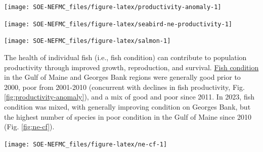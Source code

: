 \documentclass[
  10pt,
]{article}
\let\origfigure\figure
\let\endorigfigure\endfigure
\renewenvironment{figure}[1][2] {
    \expandafter\origfigure\expandafter[H]
} {
    \endorigfigure
}
\begin{document}
\begin{figure}

{\centering \texttt{[image: SOE-NEFMC\_files/figure-latex/productivity-anomaly-1]} 

}

\caption{Fish productivity measures. Top: Small-fish-per-large-fish survey biomass anomaly in the Gulf of Maine. Bottom: assessment recruitment per spawning stock biomass anomaly for stocks managed by the New England Fishery Management Council region. The summed anomaly across species is shown by the black line, drawn across all years with the same number of stocks analyzed.}\label{fig:productivity-anomaly}
\end{figure}
\begin{figure}

{\centering \texttt{[image: SOE-NEFMC\_files/figure-latex/seabird-ne-productivity-1]} 

}

\caption{Productivity of Common terns in the Gulf of Maine.}\label{fig:seabird-ne-productivity}
\end{figure}
\begin{figure}

{\centering \texttt{[image: SOE-NEFMC\_files/figure-latex/salmon-1]} 

}

\caption{Return rate proportions and abundance of Atlantic salmon.}\label{fig:salmon}
\end{figure}

The health of individual fish (i.e., fish condition) can contribute to population productivity through improved growth, reproduction, and survival. \href{https://noaa-edab.github.io/catalog/relative-condition.html}{Fish condition} in the Gulf of Maine and Georges Bank regions were generally good prior to 2000, poor from 2001-2010 (concurrent with declines in fish productivity, Fig. \ref{fig:productivity-anomaly}), and a mix of good and poor since 2011. In 2023, fish condition was mixed, with generally improving condition on Georges Bank, but the highest number of species in poor condition in the Gulf of Maine since 2010 (Fig. \ref{fig:ne-cf}).

\begin{figure}

{\centering \texttt{[image: SOE-NEFMC\_files/figure-latex/ne-cf-1]} 

}

\caption{Condition factor for fish species in New England based on fall NEFSC bottom trawl survey data. No survey was conducted in 2020.}\label{fig:ne-cf}
\end{figure}
\end{document}
